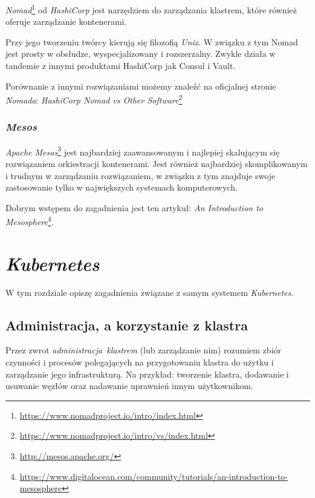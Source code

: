 \documentclass[a4paper,12pt,twoside,openany]{report}
\DeclareRobustCommand{\href}[2]{#2\footnote{\url{#1}}}
\begin{document}
\href{https://www.nomadproject.io/intro/index.html}{\emph{Nomad}} od
\emph{HashiCorp} jest narzędziem do zarządzania klastrem, które również
oferuje zarządzanie kontenerami.

Przy jego tworzeniu twórcy kierują się filozofią \emph{Unix}. W związku
z tym Nomad jest prosty w obsłudze, wyspecjalizowany i rozszerzalny.
Zwykle działa w tandemie z innymi produktami HashiCorp jak Consul i
Vault.

Porównanie z innymi rozwiązaniami możemy znaleźć na oficjalnej stronie
\emph{Nomada}:
\href{https://www.nomadproject.io/intro/vs/index.html}{\emph{HashiCorp
Nomad vs Other Software}}

\hypertarget{mesos}{%
\subsection{\texorpdfstring{\emph{Mesos}}{Mesos}}\label{mesos}}

\href{http://mesos.apache.org/}{\emph{Apache Mesos}} jest najbardziej
zaawansowanym i najlepiej skalującym się rozwiązaniem orkiestracji
kontenerami. Jest również najbardziej skomplikowanym i trudnym w
zarządzaniu rozwiązaniem, w związku z tym znajduje swoje zastosowanie
tylko w największych systemach komputerowych.

Dobrym wstępem do zagadnienia jest ten artykuł:
\href{https://www.digitalocean.com/community/tutorials/an-introduction-to-mesosphere}{\emph{An
Introduction to Mesosphere}}.

\hypertarget{kubernetes-1}{%
\chapter{\texorpdfstring{\emph{Kubernetes}}{Kubernetes}}\label{kubernetes-1}}

W tym rozdziale opiszę zagadnienia związane z samym systemem
\emph{Kubernetes}.

\hypertarget{administracja-a-korzystanie-z-klastra}{%
\section{Administracja, a korzystanie z
klastra}\label{administracja-a-korzystanie-z-klastra}}

Przez zwrot \emph{administracja~klastrem} (lub zarządzanie nim) rozumiem
zbiór czynności i procesów polegających na przygotowaniu klastra do
użytku i zarządzanie jego infrastrukturą. Na przykład: tworzenie
klastra, dodawanie i usuwanie węzłów oraz nadawanie uprawnień innym
użytkownikom.
\end{document}
